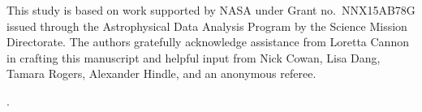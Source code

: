 \documentclass[manuscript]{aastex62}
\begin{document}
\acknowledgments 
This study is based on work supported by NASA under Grant no.~NNX15AB78G issued through the Astrophysical Data Analysis Program by the Science Mission Directorate. The authors gratefully acknowledge assistance from Loretta Cannon in crafting this manuscript and helpful input from Nick Cowan, Lisa Dang, Tamara Rogers, Alexander Hindle, and an anonymous referee.



.



\end{document}
